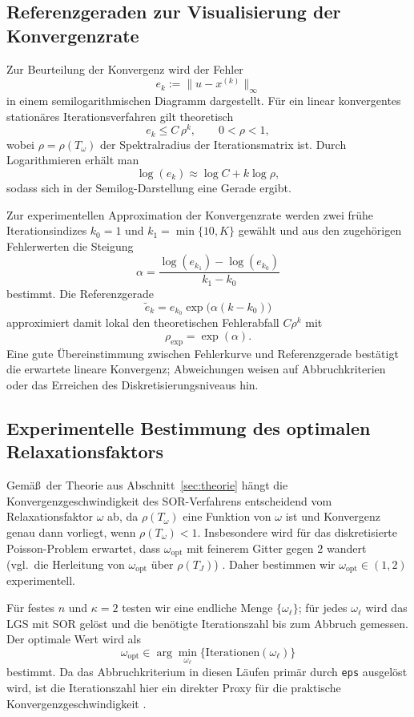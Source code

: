 \documentclass[11pt,a4paper]{article}
\begin{document}
\subsection{Referenzgeraden zur Visualisierung der Konvergenzrate}

Zur Beurteilung der Konvergenz wird der Fehler
\[
e_k := \|u - x^{(k)}\|_\infty
\]
in einem semilogarithmischen Diagramm dargestellt. Für ein linear konvergentes
stationäres Iterationsverfahren gilt theoretisch
\[
e_k \le C\,\rho^k, \qquad 0<\rho<1,
\]
wobei $\rho=\rho(T_\omega)$ der Spektralradius der Iterationsmatrix ist. Durch
Logarithmieren erhält man
\[
\log(e_k) \approx \log C + k \log \rho,
\]
sodass sich in der Semilog-Darstellung eine Gerade ergibt.

Zur experimentellen Approximation der Konvergenzrate werden zwei frühe
Iterationsindizes $k_0=1$ und $k_1=\min\{10,K\}$ gewählt und aus den
zugehörigen Fehlerwerten die Steigung
\[
\alpha
=
\frac{\log(e_{k_1})-\log(e_{k_0})}{k_1-k_0}
\]
bestimmt. Die Referenzgerade
\[
\tilde e_k
=
e_{k_0}\exp\!\bigl(\alpha (k-k_0)\bigr)
\]
approximiert damit lokal den theoretischen Fehlerabfall $C\rho^k$ mit
\[
\rho_{\mathrm{exp}}=\exp(\alpha).
\]
Eine gute Übereinstimmung zwischen Fehlerkurve und Referenzgerade bestätigt die
erwartete lineare Konvergenz; Abweichungen weisen auf Abbruchkriterien oder das
Erreichen des Diskretisierungsniveaus hin.





\subsection{Experimentelle Bestimmung des optimalen Relaxationsfaktors}
\label{sec:exp-omega}

Gem\"a\ss\ der Theorie aus Abschnitt~\ref{sec:theorie} h\"angt die Konvergenzgeschwindigkeit des SOR-Verfahrens
entscheidend vom Relaxationsfaktor $\omega$ ab, da $\rho(T_\omega)$ eine Funktion von $\omega$ ist und
Konvergenz genau dann vorliegt, wenn $\rho(T_\omega)<1$. Insbesondere wird f\"ur das diskretisierte
Poisson-Problem erwartet, dass $\omega_{\mathrm{opt}}$ mit feinerem Gitter gegen $2$ wandert
(vgl.\ die Herleitung von $\omega_{\text{opt}}$ \"uber $\rho(T_J)$) \cite{Rabus2025Serie3,Evans2000,Sewell2018}.
Daher bestimmen wir $\omega_{\mathrm{opt}}\in(1,2)$ experimentell.

F\"ur festes $n$ und $\kappa=2$ testen wir eine endliche Menge $\{\omega_\ell\}$; f\"ur jedes $\omega_\ell$ wird
das LGS mit SOR gel\"ost und die ben\"otigte Iterationszahl bis zum Abbruch gemessen. Der optimale Wert wird als
\[
\omega_{\mathrm{opt}} \in \arg\min_{\omega_\ell}\{\text{Iterationen}(\omega_\ell)\}
\]
bestimmt. Da das Abbruchkriterium in diesen L\"aufen prim\"ar durch \texttt{eps} ausgel\"ost wird, ist die
Iterationszahl hier ein direkter Proxy f\"ur die praktische Konvergenzgeschwindigkeit \cite{Rabus2025Serie3}.
\end{document}

